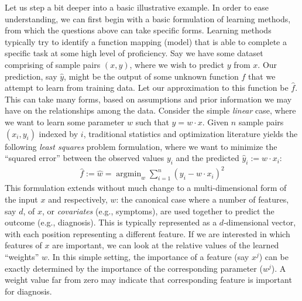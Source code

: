 
Let us step a bit deeper into a basic illustrative example. In order to ease understanding, we can first begin with a basic formulation of learning methods, from which the questions above can take specific forms. 
Learning methods typically  try to identify a function mapping (model) that is able to complete a specific task at some high level of proficiency. 
Say we have some dataset comprising of sample pairs $(x,y)$, where we wish to predict $y$ from $x$.
Our prediction, say $\hat{y}$, might be the output of some unknown function $f$ that we attempt to learn from training data. 
Let our approximation to this function be $\hat{f}$.
This can take many forms, 
based on assumptions and prior information we may have on the relationships among the data. 
Consider the simple \textit{linear} case,
where we want to learn some parameter $w$ such that $y = w\cdot x$. 
Given $n$ sample pairs $(x_i,y_i)$ indexed by $i$, traditional statistics and optimization literature yields the following \textit{least squares} problem formulation, where we want to minimize the ``squared error'' between the observed values $y_i$ and the predicted $\hat{y}_i:= w\cdot x_i$:
\begin{align}\label{eq:lq}
\hat{f}:=\hat{w} = \mathop{\arg\min}_{w} \sum_{i=1}^n (y_i - w\cdot x_i)^2
\end{align}
This formulation extends without much change to a multi-dimensional form of the input $x$ and respectively, $w$: the canonical case where a number of features, say $d$, of $x$, or \textit{covariates} (e.g., symptoms), are used together to predict the outcome (e.g., diagnosis). 
This is typically represented as a $d$-dimensional vector, with
each position representing a different feature.
If we are interested in which features of $x$ are important, we can look at the relative values of the learned ``weights'' $w$. In this simple setting, the importance of a feature (say $x^j$) can be exactly determined by the importance of the corresponding parameter ($w^j$).
A weight value far from zero may indicate that corresponding feature is important for diagnosis.


